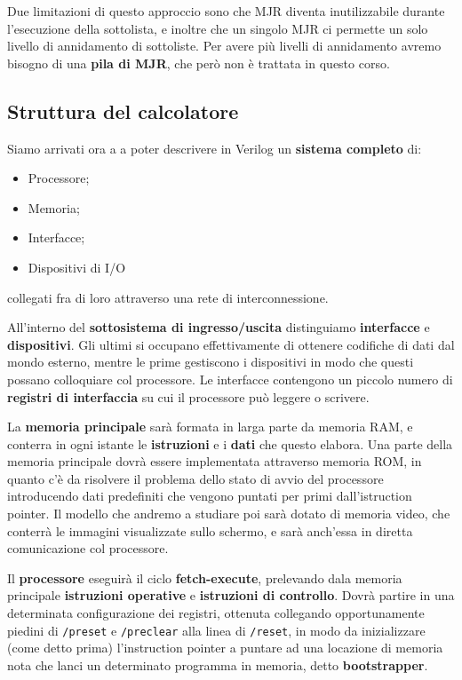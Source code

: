 \documentclass[a4paper,11pt]{article}
\begin{document}
Due limitazioni di questo approccio sono che MJR diventa inutilizzabile durante l'esecuzione della sottolista, e inoltre che un singolo MJR ci permette un solo livello di annidamento di sottoliste.
Per avere più livelli di annidamento avremo bisogno di una \textbf{pila di MJR}, che però non è trattata in questo corso.

\subsection{Struttura del calcolatore}
Siamo arrivati ora a a poter descrivere in Verilog un \textbf{sistema completo} di:
\begin{itemize}
	\item Processore;
	\item Memoria;
	\item Interfacce;
	\item Dispositivi di I/O
\end{itemize}
collegati fra di loro attraverso una rete di interconnessione.

All'interno del \textbf{sottosistema di ingresso/uscita} distinguiamo \textbf{interfacce} e \textbf{dispositivi}.
Gli ultimi si occupano effettivamente di ottenere codifiche di dati dal mondo esterno, mentre le prime gestiscono i dispositivi in modo che questi possano colloquiare col processore.
Le interfacce contengono un piccolo numero di \textbf{registri di interfaccia} su cui il processore può leggere o scrivere.

La \textbf{memoria principale} sarà formata in larga parte da memoria RAM, e conterra in ogni istante le \textbf{istruzioni} e i \textbf{dati} che questo elabora.
Una parte della memoria principale dovrà essere implementata attraverso memoria ROM, in quanto c'è da risolvere il problema dello stato di avvio del processore introducendo dati predefiniti che vengono puntati per primi dall'istruction pointer.
Il modello che andremo a studiare poi sarà dotato di memoria video, che conterrà le immagini visualizzate sullo schermo, e sarà anch'essa in diretta comunicazione col processore.

Il \textbf{processore} eseguirà il ciclo \textbf{fetch-execute}, prelevando dala memoria principale \textbf{istruzioni operative} e \textbf{istruzioni di controllo}.
Dovrà partire in una determinata configurazione dei registri, ottenuta collegando opportunamente piedini di \lstinline|/preset| e \lstinline|/preclear| alla linea di \lstinline|/reset|, in modo da inizializzare (come detto prima) l'instruction pointer a puntare ad una locazione di memoria nota che lanci un determinato programma in memoria, detto \textbf{bootstrapper}.
\end{document}
